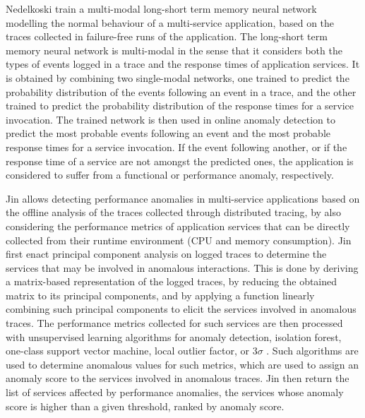 Nedelkoski \etal \cite{35_Nedelkoski2019_AnomalyDetectionTracingData} train a multi-modal long-short term memory neural network \cite{Goodfellow2016_DeepLearningBook} modelling the normal behaviour of a multi-service application, based on the traces collected in failure-free runs of the application.
The long-short term memory neural network is multi-modal in the sense that it considers both the types of events logged in a trace and the response times of application services.
It is obtained by combining two single-modal networks, one trained to predict the probability distribution of the events following an event in a trace, and the other trained to predict the probability distribution of the response times for a service invocation.
The trained network is then used in online anomaly detection to predict the most probable events following an event and the most probable response times for a service invocation. 
If the event following another, or if the response time of a service are not amongst the predicted ones, the application is considered to suffer from a functional or performance anomaly, respectively.

Jin \etal \cite{22_Jin2020_AnomalyDetectionMicroservicesRPCA} allows detecting performance anomalies in multi-service applications based on the offline analysis of the traces collected through distributed tracing, by also considering the performance metrics of application services that can be directly collected from their runtime environment (\eg CPU and memory consumption).
Jin \etal \cite{22_Jin2020_AnomalyDetectionMicroservicesRPCA} first enact principal component analysis on logged traces to determine the services that may be involved in anomalous interactions.
This is done by deriving a matrix-based representation of the logged traces, by reducing the obtained matrix to its principal components, and by applying a function linearly combining such principal components to elicit the services involved in anomalous traces. 
The performance metrics collected for such services are then processed with unsupervised learning algorithms for anomaly detection, \viz isolation forest, one-class support vector machine, local outlier factor, or 3$\sigma$ \cite{Chandola2009_SurveyAnomalyDetection}. 
Such algorithms are used to determine anomalous values for such metrics, which are used to assign an anomaly score to the services involved in anomalous traces.
Jin \etal \cite{22_Jin2020_AnomalyDetectionMicroservicesRPCA} then return the list of services affected by performance anomalies, \viz the services whose anomaly score is higher than a given threshold, ranked by anomaly score.


